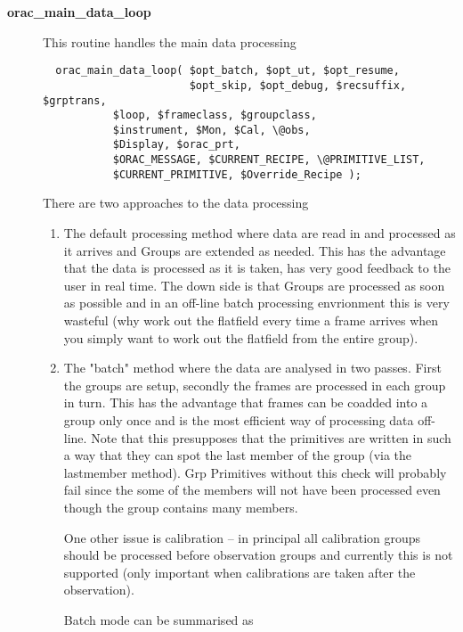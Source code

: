 \begin{description}
\item[{\textbf{orac\_main\_data\_loop}}] \mbox{}

This routine handles the main data processing

\begin{verbatim}
  orac_main_data_loop( $opt_batch, $opt_ut, $opt_resume,
                       $opt_skip, $opt_debug, $recsuffix, $grptrans,
           $loop, $frameclass, $groupclass,
           $instrument, $Mon, $Cal, \@obs,
           $Display, $orac_prt,
           $ORAC_MESSAGE, $CURRENT_RECIPE, \@PRIMITIVE_LIST,
           $CURRENT_PRIMITIVE, $Override_Recipe );
\end{verbatim}


There are two approaches to the data processing

\begin{enumerate}

\item

The default processing method where data are read in and processed as
it arrives and Groups are extended as needed. This has the advantage
that the data is processed as it is taken, has very good feedback to
the user in real time. The down side is that Groups are processed as
soon as possible and in an off-line batch processing envrionment this
is very wasteful (why work out the flatfield every time a frame
arrives when you simply want to work out the flatfield from the entire
group).


\item

The "batch" method where the data are analysed in two passes.  First
the groups are setup, secondly the frames are processed in each group
in turn. This has the advantage that frames can be coadded into a
group only once and is the most efficient way of processing data
off-line. Note that this presupposes that the primitives are written
in such a way that they can spot the last member of the group (via the
lastmember method). Grp Primitives without this check will probably
fail since the some of the members will not have been processed even
though the group contains many members.



One other issue is calibration -- in principal all calibration groups
should be processed before observation groups and currently this is
not supported (only important when calibrations are taken after the
observation).



Batch mode can be summarised as


\end{enumerate}
\end{description}
